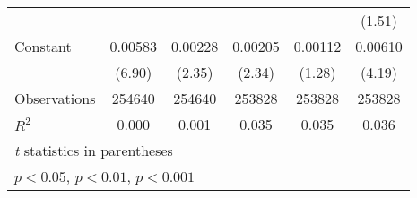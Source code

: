 {\begin{tabular}{l*{5}{c}}
                &                  &                  &                  &                  &   (1.51)         \\
[1em]
Constant        &  0.00583\sym{***}&  0.00228\sym{*}  &  0.00205\sym{*}  &  0.00112         &  0.00610\sym{***}\\
                &   (6.90)         &   (2.35)         &   (2.34)         &   (1.28)         &   (4.19)         \\
\hline
Observations    &   254640         &   254640         &   253828         &   253828         &   253828         \\
\(R^{2}\)       &    0.000         &    0.001         &    0.035         &    0.035         &    0.036         \\
\hline\hline
\multicolumn{6}{l}{\footnotesize \textit{t} statistics in parentheses}\\
\multicolumn{6}{l}{\footnotesize \sym{*} \(p<0.05\), \sym{**} \(p<0.01\), \sym{***} \(p<0.001\)}\\
\end{tabular}
}
